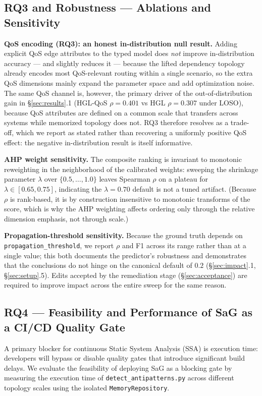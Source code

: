 \documentclass[review]{elsarticle}
\begin{document}
\subsection{RQ3 and Robustness --- Ablations and Sensitivity}

\textbf{QoS encoding (RQ3): an honest in-distribution null result.} Adding explicit QoS edge
attributes to the typed model does \emph{not} improve in-distribution accuracy --- and slightly
reduces it --- because the lifted dependency topology already encodes most QoS-relevant routing
within a single scenario, so the extra QoS dimensions mainly expand the parameter space and add
optimization noise. The same QoS channel is, however, the primary driver of the out-of-distribution
gain in \S\ref{sec:results}.1 (HGL-QoS $\rho=0.401$ vs HGL $\rho=0.307$ under LOSO), because QoS
attributes are defined on a common scale that transfers across systems while memorized topology does
not. RQ3 therefore resolves as a trade-off, which we report as stated rather than recovering a
uniformly positive QoS effect: the negative in-distribution result is itself informative.

\textbf{AHP weight sensitivity.} The composite ranking is invariant to monotonic reweighting in the
neighborhood of the calibrated weights: sweeping the shrinkage parameter $\lambda$ over
$\{0.5,\dots,1.0\}$ leaves Spearman $\rho$ on a plateau for $\lambda \in [0.65, 0.75]$, indicating
the $\lambda=0.70$ default is not a tuned artifact. (Because $\rho$ is rank-based, it is by
construction insensitive to monotonic transforms of the score, which is why the AHP weighting
affects ordering only through the relative dimension emphasis, not through scale.)

\textbf{Propagation-threshold sensitivity.} Because the ground truth depends on
\texttt{propagation\_threshold}, we report $\rho$ and F1 across its range rather than at a single
value; this both documents the predictor's robustness and demonstrates that the conclusions do not
hinge on the canonical default of $0.2$ (\S\ref{sec:impact}.1, \S\ref{sec:setup}.5). Edits accepted
by the remediation stage (\S\ref{sec:acceptance}) are required to improve impact across the entire
sweep for the same reason.

\subsection{RQ4 --- Feasibility and Performance of SaG as a CI/CD Quality Gate}

A primary blocker for continuous Static System Analysis (SSA) is execution time: developers will
bypass or disable quality gates that introduce significant build delays. We evaluate the feasibility
of deploying SaG as a blocking gate by measuring the execution time of \texttt{detect\_antipatterns.py}
across different topology scales using the isolated \texttt{MemoryRepository}.
\end{document}
